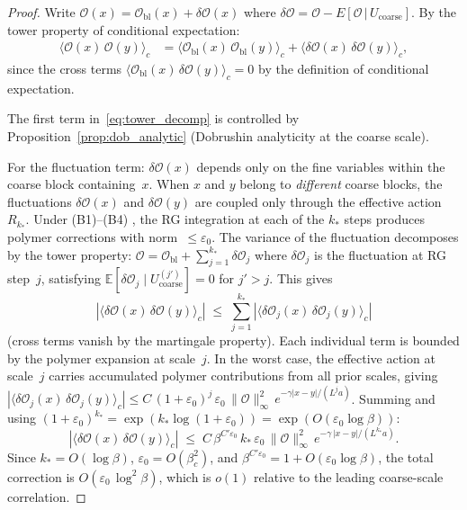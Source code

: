 \documentclass[11pt,a4paper]{article}
\theoremstyle{plain}
\theoremstyle{definition}
\theoremstyle{remark}
\newcommand{\E}{\mathbb{E}}
\begin{document}
\begin{proof}
Write $\mathcal{O}(x) = \mathcal{O}_{\mathrm{bl}}(x)
+ \delta\mathcal{O}(x)$ where $\delta\mathcal{O}
= \mathcal{O} - E[\mathcal{O}\,|\,U_{\mathrm{coarse}}]$.
By the tower property of conditional expectation:
\begin{align}
  \langle \mathcal{O}(x)\,\mathcal{O}(y)\rangle_c
  &= \langle \mathcal{O}_{\mathrm{bl}}(x)\,
  \mathcal{O}_{\mathrm{bl}}(y)\rangle_c
  + \langle \delta\mathcal{O}(x)\,
  \delta\mathcal{O}(y)\rangle_c,
  \label{eq:tower_decomp}
\end{align}
since the cross terms $\langle
\mathcal{O}_{\mathrm{bl}}(x)\,\delta\mathcal{O}(y)
\rangle_c = 0$ by the definition of conditional
expectation.

The first term in~\eqref{eq:tower_decomp} is controlled
by Proposition~\ref{prop:dob_analytic} (Dobrushin
analyticity at the coarse scale).

For the fluctuation term: $\delta\mathcal{O}(x)$ depends
only on the fine variables within the coarse block
containing~$x$.  When $x$ and $y$ belong to
\emph{different} coarse blocks, the fluctuations
$\delta\mathcal{O}(x)$ and $\delta\mathcal{O}(y)$
are coupled only through the effective action~$R_{k_*}$.
Under (B1)--(B4) \cite{FontesSU2}, the RG integration at each
of the $k_*$ steps produces polymer corrections with
norm~$\leq \varepsilon_0$.  The variance of the fluctuation
decomposes by the tower property:
$\mathcal{O} = \mathcal{O}_{\mathrm{bl}}
+ \sum_{j=1}^{k_*} \delta\mathcal{O}_j$
where $\delta\mathcal{O}_j$ is the fluctuation at
RG step~$j$, satisfying
$\E[\delta\mathcal{O}_j \mid U_{\mathrm{coarse}}^{(j')}]
= 0$ for $j' > j$.  This gives
\begin{equation}
  |\langle \delta\mathcal{O}(x)\,
  \delta\mathcal{O}(y)\rangle_c|
  \;\leq\; \sum_{j=1}^{k_*}
  |\langle \delta\mathcal{O}_j(x)\,
  \delta\mathcal{O}_j(y)\rangle_c|
\end{equation}
(cross terms vanish by the martingale property).
Each individual term is bounded by the polymer expansion
at scale~$j$.  In the worst case, the effective action
at scale~$j$ carries accumulated polymer contributions
from all prior scales, giving
$|\langle \delta\mathcal{O}_j(x)\,
\delta\mathcal{O}_j(y)\rangle_c|
\leq C\,(1+\varepsilon_0)^j\,\varepsilon_0\,
\|\mathcal{O}\|_\infty^2\,
e^{-\gamma|x-y|/(L^j a)}$.
Summing and using $(1+\varepsilon_0)^{k_*}
= \exp(k_*\log(1+\varepsilon_0))
= \exp(O(\varepsilon_0\log\beta))$:
\begin{equation}
  |\langle \delta\mathcal{O}(x)\,
  \delta\mathcal{O}(y)\rangle_c|
  \;\leq\; C\,\beta^{C'\varepsilon_0}\,
  k_*\,\varepsilon_0\,
  \|\mathcal{O}\|_\infty^2\,
  e^{-\gamma\,|x-y|/(L^{k_*}a)}.
\end{equation}
Since $k_* = O(\log\beta)$,
$\varepsilon_0 = O(\beta_c^2)$, and
$\beta^{C'\varepsilon_0} = 1 + O(\varepsilon_0\log\beta)$,
the total correction is
$O(\varepsilon_0\,\log^2\!\beta)$,
which is $o(1)$ relative to the leading coarse-scale
correlation.
\end{proof}
\end{document}
